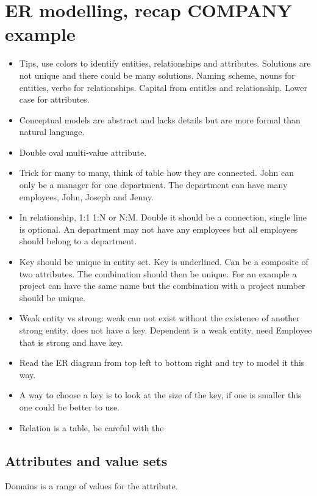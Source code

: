 
\section{ER modelling, recap COMPANY example}

\begin{itemize}
	\item Tips, use colors to identify entities, relationships and attributes. Solutions are not unique and there could be many solutions. Naming scheme, nouns for entities, verbs for relationships. Capital from entitles and relationship. Lower case for attributes. 
	\item Conceptual models are abstract and lacks details but are more formal than natural language. 
	\item Double oval multi-value attribute. 
	\item Trick for many to many, think of table how they are connected. John can only be a manager for one department. The department can have many employees, John, Joseph and Jenny. 
	\item In relationship, 1:1 1:N or N:M. Double it should be a connection, single line is optional. An department may not have any employees but all employees should belong to a department. 
	\item Key should be unique in entity set. Key is underlined. Can be a composite of two attributes. The combination should then be unique. For an example a project can have the same name but the combination with a project number should be unique. 
	\item Weak entity vs strong: weak can not exist without the existence of another strong entity, does not have a key. Dependent is a weak entity, need Employee that is strong and have key. 
	\item Read the ER diagram from top left to bottom right and try to model it this way. 
	\item A way to choose a key is to look at the size of the key, if one is smaller this one could be better to use. 
	\item Relation is a table, be careful with the 
\end{itemize}

\subsection*{Attributes and value sets}
Domains is a range of values for the attribute. 

